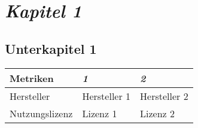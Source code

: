 \chapter{\textit{Kapitel 1}}
\label{chap:Kapitel-1}
\section{Unterkapitel 1}
\label{sec:unterkapitel-1}
\begin{center}
	\begin{tabular}{ |p{5cm}||p{4cm}|p{4cm}| }
		\hline
		Metriken & \textit{1} & \textit{2} \\
		\hline
		Hersteller & Hersteller 1 & Hersteller 2\\
		Nutzungslizenz & Lizenz 1 & Lizenz 2\\
		\hline
		
	\end{tabular}
	\captionsetup{hypcap=false}
	\label{tab:github-keycloak-authentik}
\end{center}